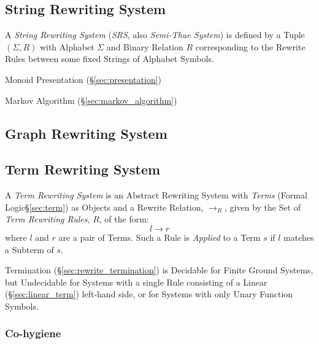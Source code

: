 \subsection{String Rewriting System}\label{sec:string_rewriting}

A \emph{String Rewriting System} (\emph{SRS}, also \emph{Semi-Thue
  System}) is defined by a Tuple $(\Sigma, R)$ with Alphabet $\Sigma$
and Binary Relation $R$ corresponding to the Rewrite Rules between
some fixed Strings of Alphabet Symbols.

Monoid Presentation (\S\ref{sec:presentation})

Markov Algorithm (\S\ref{sec:markov_algorithm})



\subsection{Graph Rewriting System}\label{sec:graph_rewriting}

\subsection{Term Rewriting System}\label{sec:term_rewriting}

A \emph{Term Rewriting System} is an Abstract Rewriting System with
\emph{Terms} (Formal Logic\S\ref{sec:term}) as Objects and a Rewrite
Relation, $\rightarrow_R$, given by the Set of \emph{Term Rewriting
  Rules}, $R$, of the form:
\[
  l \rightarrow r
\]
where $l$ and $r$ are a pair of Terms. Such a Rule is \emph{Applied}
to a Term $s$ if $l$ matches a Subterm of $s$.

Termination (\S\ref{sec:rewrite_termination}) is Decidable for Finite Ground
Systems, but Undecidable for Systems with a single Rule consisting of
a Linear (\S\ref{sec:linear_term}) left-hand side, or for Systems with
only Unary Function Symbols. %



\subsubsection{Co-hygiene}\label{sec:cohygiene}

